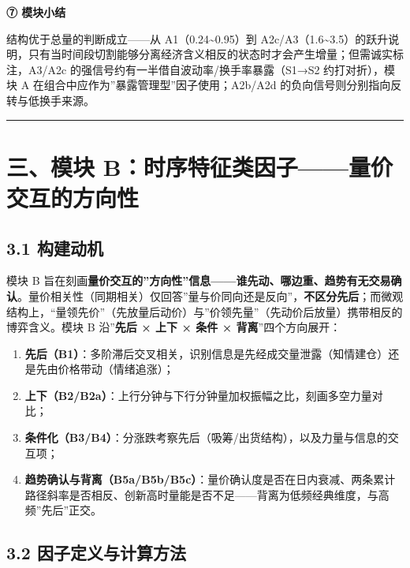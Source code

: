 \documentclass[UTF8,a4paper,zihao=-4,fontset=windows]{ctexart}
\providecommand{\tightlist}{\setlength{\itemsep}{0pt}\setlength{\parskip}{0pt}}
\begin{document}
\textbf{⑦ 模块小结}

结构优于总量的判断成立------从 A1（0.24\textasciitilde0.95）到
A2c/A3（1.6\textasciitilde3.5）的跃升说明，只有当时间段切割能够分离经济含义相反的状态时才会产生增量；但需诚实标注，A3/A2c
的强信号约有一半借自波动率/换手率暴露（S1→S2 约打对折），模块 A
在组合中应作为''暴露管理型''因子使用；A2b/A2d
的负向信号则分别指向反转与低换手来源。

\begin{center}\rule{0.5\linewidth}{0.5pt}\end{center}

\section{三、模块
B：时序特征类因子------量价交互的方向性}\label{ux4e09ux6a21ux5757-bux65f6ux5e8fux7279ux5f81ux7c7bux56e0ux5b50ux91cfux4ef7ux4ea4ux4e92ux7684ux65b9ux5411ux6027}

\subsection{3.1 构建动机}\label{ux6784ux5efaux52a8ux673a-1}

模块 B
旨在刻画\textbf{量价交互的''方向性''信息------谁先动、哪边重、趋势有无交易确认}。量价相关性（同期相关）仅回答''量与价同向还是反向''，\textbf{不区分先后}；而微观结构上，``量领先价''（先放量后动价）与''价领先量''（先动价后放量）携带相反的博弈含义。模块
B 沿''\textbf{先后 × 上下 × 条件 × 背离}''四个方向展开：

\begin{enumerate}
\def\labelenumi{\arabic{enumi}.}
\tightlist
\item
  \textbf{先后（B1）}：多阶滞后交叉相关，识别信息是先经成交量泄露（知情建仓）还是先由价格带动（情绪追涨）；
\item
  \textbf{上下（B2/B2a）}：上行分钟与下行分钟量加权振幅之比，刻画多空力量对比；
\item
  \textbf{条件化（B3/B4）}：分涨跌考察先后（吸筹/出货结构），以及力量与信息的交互项；
\item
  \textbf{趋势确认与背离（B5a/B5b/B5c）}：量价确认度是否在日内衰减、两条累计路径斜率是否相反、创新高时量能是否不足------背离为低频经典维度，与高频''先后''正交。
\end{enumerate}

\subsection{3.2
因子定义与计算方法}\label{ux56e0ux5b50ux5b9aux4e49ux4e0eux8ba1ux7b97ux65b9ux6cd5-1}
\end{document}

